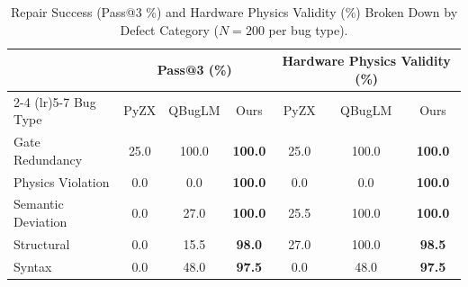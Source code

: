 \begin{table}[t]
\centering
\caption{Repair Success (Pass@3 \%) and Hardware Physics Validity (\%) Broken Down by Defect Category ($N=200$ per bug type).}
\label{tab:bug_breakdown}
\begin{tabular}{lcccccc}
\hline
 & \multicolumn{3}{c}{\textbf{Pass@3 (\%)}} & \multicolumn{3}{c}{\textbf{Hardware Physics Validity (\%)}}\\
\cmidrule(lr){2-4} \cmidrule(lr){5-7}
Bug Type & PyZX & QBugLM & Ours & PyZX & QBugLM & Ours \\
\hline
Gate Redundancy & 25.0 & 100.0 & \textbf{100.0} & 25.0 & 100.0 & \textbf{100.0} \\
Physics Violation & 0.0 & 0.0 & \textbf{100.0} & 0.0 & 0.0 & \textbf{100.0} \\
Semantic Deviation & 0.0 & 27.0 & \textbf{100.0} & 25.5 & 100.0 & \textbf{100.0} \\
Structural & 0.0 & 15.5 & \textbf{98.0} & 27.0 & 100.0 & \textbf{98.5} \\
Syntax & 0.0 & 48.0 & \textbf{97.5} & 0.0 & 48.0 & \textbf{97.5} \\
\hline
\end{tabular}
\end{table}
